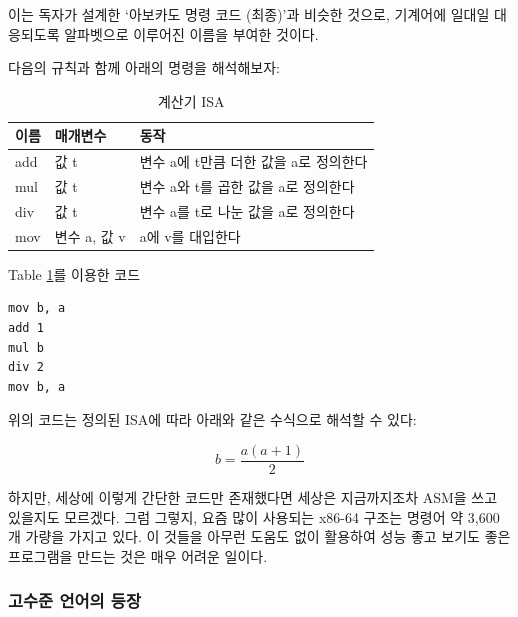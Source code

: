 \documentclass{article}
\begin{document}
이는 독자가 설계한 `아보카도 명령 코드 (최종)'과 비슷한 것으로,
기계어에 일대일 대응되도록 알파벳으로 이루어진 이름을 부여한 것이다.

다음의 규칙과 함께 아래의 명령을 해석해보자:

\begin{table}[!h]
    \centering

    \caption{계산기 ISA}
    \label{Tab:simple-calculator-isa}

    \begin{tabular}{ || m{2em} | m{5em} | m{22em} || }
        \hline
        이름 & 매개변수 & 동작 \\
        \hline\hline
        add  & 값 t & 변수 a에 t만큼 더한 값을 a로 정의한다 \\
        \hline
        mul  & 값 t & 변수 a와 t를 곱한 값을 a로 정의한다 \\
        \hline
        div  & 값 t & 변수 a를 t로 나눈 값을 a로 정의한다 \\
        \hline
        mov  & 변수 a, 값 v & a에 v를 대입한다 \\
        \hline
    \end{tabular}
\end{table}

\begin{center}

    \centering
    
    Table \ref{Tab:simple-calculator-isa}를 이용한 코드

\begin{lstlisting}
mov b, a
add 1
mul b
div 2
mov b, a
\end{lstlisting}
\end{center}

위의 코드는 정의된 ISA에 따라 아래와 같은 수식으로 해석할 수 있다:

\begin{equation}
b = \frac{a(a + 1)}{2}
\end{equation}

하지만, 세상에 이렇게 간단한 코드만 존재했다면 세상은 지금까지조차 ASM을
쓰고 있을지도 모르겠다.
그럼 그렇지, 요즘 많이 사용되는 x86-64 구조는 명령어 약 3,600개 가량을
가지고 있다.
이 것들을 아무런 도움도 없이 활용하여 성능 좋고 보기도 좋은 프로그램을
만드는 것은 매우 어려운 일이다.

\subsubsection{고수준 언어의 등장}
\end{document}
